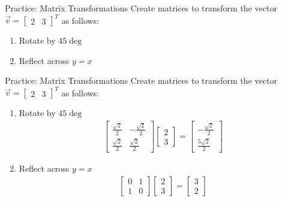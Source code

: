 \begin{frame}{Practice: Matrix Transformations}
    Create matrices to transform the vector $\vec{v} = \begin{bmatrix} 2 & 3 \end{bmatrix}^T$ as follows:
    \begin{enumerate}
        \item Rotate by $45\deg$
        \item Reflect across $y = x$
    \end{enumerate}
\end{frame}

\begin{frame}{Practice: Matrix Transformations}
    Create matrices to transform the vector $\vec{v} = \begin{bmatrix} 2 & 3 \end{bmatrix}^T$ as follows:
    \begin{enumerate}
        \item Rotate by $45\deg$
        \begin{align*}
            \begin{bmatrix}
                \frac{\sqrt{2}}{2} & -\frac{\sqrt{2}}{2} \\[0.8ex]
                \frac{\sqrt{2}}{2} & \frac{\sqrt{2}}{2}
            \end{bmatrix}
            \begin{bmatrix} 
                2 \\ 3 
            \end{bmatrix} = 
            \begin{bmatrix} 
                -\frac{\sqrt{2}}{2} \\[0.8ex] \frac{5\sqrt{2}}{2}
            \end{bmatrix}
        \end{align*}
        \item Reflect across $y = x$
        \begin{align*}
            \begin{bmatrix}
                0 & 1 \\
                1 & 0
            \end{bmatrix}
            \begin{bmatrix}
                2 \\ 3
            \end{bmatrix} = 
            \begin{bmatrix}
                3 \\ 2
            \end{bmatrix}
        \end{align*}
    \end{enumerate}
\end{frame}